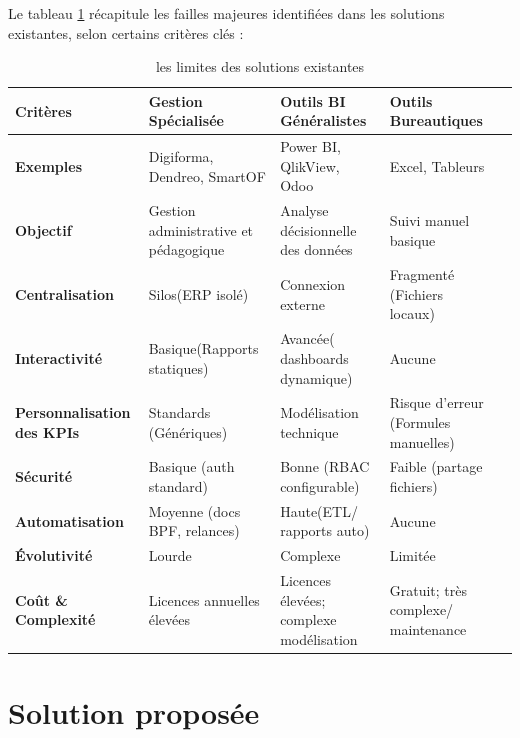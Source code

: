 \noindent Le tableau \ref{tab:comparaison} récapitule les failles majeures identifiées dans les solutions existantes, selon certains critères clés :
\begin{longtable}{ | p{2.7cm} | p{2.7cm} | p{2.7cm} | p{2.7cm} | p{2.7cm} |}
    \caption{les limites des solutions existantes}
    \label{tab:comparaison} \\
        \hline
        \textbf{Critères} & \textbf{Gestion Spécialisée} & \textbf{Outils BI Généralistes} & \textbf{Outils Bureautiques}\\
        \hline
        \textbf{Exemples} & Digiforma, Dendreo, SmartOF & Power BI, QlikView, Odoo & Excel, Tableurs \\
        \hline
        \textbf{Objectif} &  Gestion administrative et pédagogique & Analyse décisionnelle des données & Suivi manuel basique  \\
        \hline
        \textbf{Centralisation} & Silos(ERP isolé) & Connexion externe & Fragmenté (Fichiers locaux) \\
        \hline
        \textbf{Interactivité} & Basique(Rapports statiques) & Avancée( dashboards dynamique) & Aucune\\
        \hline
        \textbf{Personnalisation des KPIs} & Standards (Génériques) & Modélisation technique & Risque d'erreur (Formules manuelles)\\
        \hline
        \textbf{Sécurité} & Basique (auth standard) & Bonne (RBAC configurable) & Faible (partage fichiers) \\
        \hline
        \textbf{Automatisation} & Moyenne (docs BPF, relances) & Haute(ETL/ rapports auto)  & Aucune \\
        \hline
        \textbf{Évolutivité} & Lourde &Complexe & Limitée\\
        \hline
        \textbf{Coût \& Complexité} & Licences annuelles élevées & Licences élevées; complexe modélisation  & Gratuit; très complexe/ maintenance\\
        \hline
    \end{longtable}
\section{Solution proposée}
\label{sec:Solution proposée}

